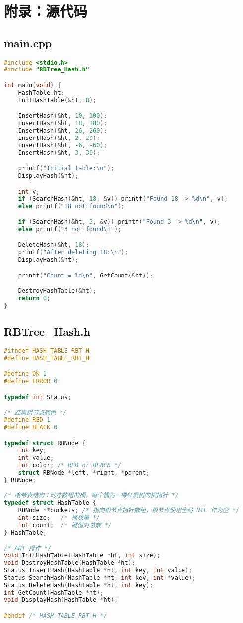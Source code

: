 \documentclass[12pt,a4paper]{article}
\begin{document}
\section{附录：源代码}

\subsection{main.cpp}
\begin{lstlisting}[language=C++,caption=main.cpp]
#include <stdio.h>
#include "RBTree_Hash.h"

int main(void) {
    HashTable ht;
    InitHashTable(&ht, 8);

    InsertHash(&ht, 10, 100);
    InsertHash(&ht, 18, 180);
    InsertHash(&ht, 26, 260);
    InsertHash(&ht, 2, 20);
    InsertHash(&ht, -6, -60);
    InsertHash(&ht, 3, 30);

    printf("Initial table:\n");
    DisplayHash(&ht);

    int v;
    if (SearchHash(&ht, 18, &v)) printf("Found 18 -> %d\n", v);
    else printf("18 not found\n");

    if (SearchHash(&ht, 3, &v)) printf("Found 3 -> %d\n", v);
    else printf("3 not found\n");

    DeleteHash(&ht, 18);
    printf("After deleting 18:\n");
    DisplayHash(&ht);

    printf("Count = %d\n", GetCount(&ht));

    DestroyHashTable(&ht);
    return 0;
}
\end{lstlisting}

\subsection{RBTree\_Hash.h}
\begin{lstlisting}[language=C++,caption=RBTree\_Hash.h]
#ifndef HASH_TABLE_RBT_H
#define HASH_TABLE_RBT_H

#define OK 1
#define ERROR 0

typedef int Status;

/* 红黑树节点颜色 */
#define RED 1
#define BLACK 0

typedef struct RBNode {
    int key;
    int value;
    int color; /* RED or BLACK */
    struct RBNode *left, *right, *parent;
} RBNode;

/* 哈希表结构：动态数组的桶，每个桶为一棵红黑树的根指针 */
typedef struct HashTable {
    RBNode **buckets; /* 指向根节点指针数组，根节点使用全局 NIL 作为空 */
    int size;   /* 桶数量 */
    int count;  /* 键值对总数 */
} HashTable;

/* ADT 操作 */
void InitHashTable(HashTable *ht, int size);
void DestroyHashTable(HashTable *ht);
Status InsertHash(HashTable *ht, int key, int value);
Status SearchHash(HashTable *ht, int key, int *value);
Status DeleteHash(HashTable *ht, int key);
int GetCount(HashTable *ht);
void DisplayHash(HashTable *ht);

#endif /* HASH_TABLE_RBT_H */
\end{lstlisting}
\end{document}
